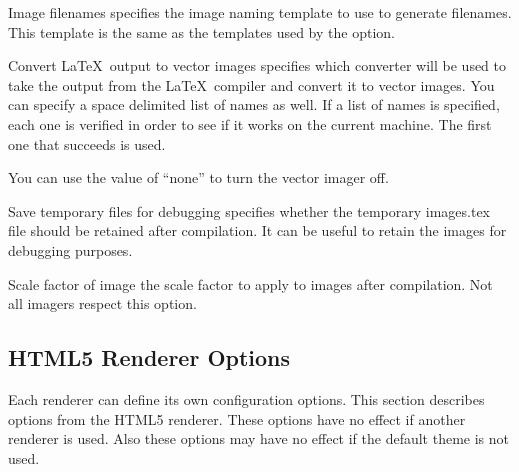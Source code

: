 \begin{configuration}{Image filenames}
specifies the image naming template to use to generate filenames.  This
template is the same as the templates used by the 
option.
\end{configuration}

\begin{configuration}{Convert \LaTeX\ output to vector images}
specifies which converter will be used to take the output from the
\LaTeX\ compiler and convert it to vector images.  You can specify a space
delimited list of names as well.  If a list of names is specified,
each one is verified in order to see if it works on the current machine.
The first one that succeeds is used.

You can use the value of ``none'' to turn the vector imager off.

\end{configuration}

\begin{configuration}{Save temporary files for debugging}
specifies whether the temporary images.tex file should be retained after
compilation. It can be useful to retain the images for debugging purposes.
\end{configuration}

\begin{configuration}{Scale factor of image}
the scale factor to apply to images after compilation. Not all imagers respect
this option.
\end{configuration}

\subsection{HTML5 Renderer Options\label{sec:config-html5}}

Each renderer can define its own configuration options. This section
describes options from the HTML5 renderer. These options have no effect
if another renderer is used. Also these options may have no effect if
the default theme is not used.


